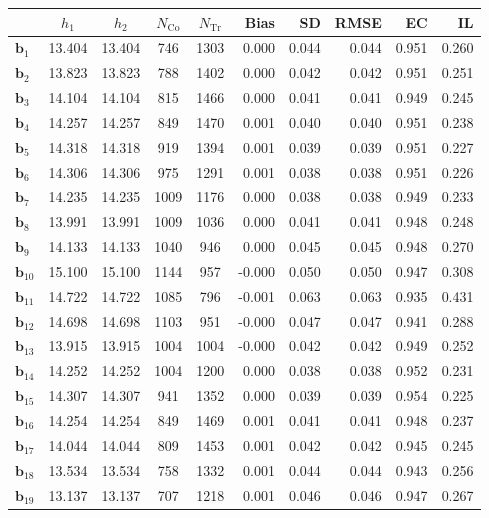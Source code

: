 \documentclass[10pt]{article}
\newcommand{\bb}{\mathbf{b}}
\begin{document}
\begin{table}[p]
    \centering
\begin{tabular}{lccccrrrrr}
\toprule\toprule
 & $h_1$ & $h_2$ & $N_{\mathrm{Co}}$ & $N_{\mathrm{Tr}}$ & Bias & SD & RMSE & EC & IL \\
\midrule
$\bb_{1}$ & 13.404 & 13.404 & 746 & 1303 & 0.000 & 0.044 & 0.044 & 0.951 & 0.260 \\
$\bb_{2}$ & 13.823 & 13.823 & 788 & 1402 & 0.000 & 0.042 & 0.042 & 0.951 & 0.251 \\
$\bb_{3}$ & 14.104 & 14.104 & 815 & 1466 & 0.000 & 0.041 & 0.041 & 0.949 & 0.245 \\
$\bb_{4}$ & 14.257 & 14.257 & 849 & 1470 & 0.001 & 0.040 & 0.040 & 0.951 & 0.238 \\
$\bb_{5}$ & 14.318 & 14.318 & 919 & 1394 & 0.001 & 0.039 & 0.039 & 0.951 & 0.227 \\
$\bb_{6}$ & 14.306 & 14.306 & 975 & 1291 & 0.001 & 0.038 & 0.038 & 0.951 & 0.226 \\
$\bb_{7}$ & 14.235 & 14.235 & 1009 & 1176 & 0.000 & 0.038 & 0.038 & 0.949 & 0.233 \\
$\bb_{8}$ & 13.991 & 13.991 & 1009 & 1036 & 0.000 & 0.041 & 0.041 & 0.948 & 0.248 \\
$\bb_{9}$ & 14.133 & 14.133 & 1040 & 946 & 0.000 & 0.045 & 0.045 & 0.948 & 0.270 \\
$\bb_{10}$ & 15.100 & 15.100 & 1144 & 957 & -0.000 & 0.050 & 0.050 & 0.947 & 0.308 \\
$\bb_{11}$ & 14.722 & 14.722 & 1085 & 796 & -0.001 & 0.063 & 0.063 & 0.935 & 0.431 \\
$\bb_{12}$ & 14.698 & 14.698 & 1103 & 951 & -0.000 & 0.047 & 0.047 & 0.941 & 0.288 \\
$\bb_{13}$ & 13.915 & 13.915 & 1004 & 1004 & -0.000 & 0.042 & 0.042 & 0.949 & 0.252 \\
$\bb_{14}$ & 14.252 & 14.252 & 1004 & 1200 & 0.000 & 0.038 & 0.038 & 0.952 & 0.231 \\
$\bb_{15}$ & 14.307 & 14.307 & 941 & 1352 & 0.000 & 0.039 & 0.039 & 0.954 & 0.225 \\
$\bb_{16}$ & 14.254 & 14.254 & 849 & 1469 & 0.001 & 0.041 & 0.041 & 0.948 & 0.237 \\
$\bb_{17}$ & 14.044 & 14.044 & 809 & 1453 & 0.001 & 0.042 & 0.042 & 0.945 & 0.245 \\
$\bb_{18}$ & 13.534 & 13.534 & 758 & 1332 & 0.001 & 0.044 & 0.044 & 0.943 & 0.256 \\
$\bb_{19}$ & 13.137 & 13.137 & 707 & 1218 & 0.001 & 0.046 & 0.046 & 0.947 & 0.267 \\

\end{tabular}
\end{table}
\end{document}
